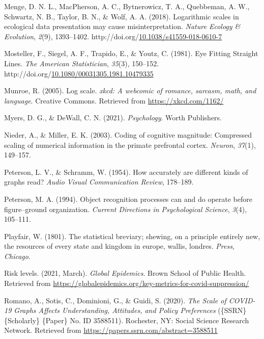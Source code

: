 \documentclass[print]{nuthesis}
\newlength{\cslhangindent}
\newenvironment{CSLReferences}%
{\setlength{\parindent}{0pt}%
\everypar{\setlength{\hangindent}{\cslhangindent}}\ignorespaces}%
{\par}
\begin{document}
\begin{CSLReferences}{1}{0}
\leavevmode\hypertarget{ref-menge_logarithmic_2018}{}%
Menge, D. N. L., MacPherson, A. C., Bytnerowicz, T. A., Quebbeman, A. W., Schwartz, N. B., Taylor, B. N., \& Wolf, A. A. (2018). Logarithmic scales in ecological data presentation may cause misinterpretation. \emph{Nature Ecology \& Evolution}, \emph{2}(9), 1393--1402. http://doi.org/\href{https://doi.org/10.1038/s41559-018-0610-7}{10.1038/s41559-018-0610-7}

\leavevmode\hypertarget{ref-mosteller_eye_1981}{}%
Mosteller, F., Siegel, A. F., Trapido, E., \& Youtz, C. (1981). Eye {Fitting} {Straight} {Lines}. \emph{The American Statistician}, \emph{35}(3), 150--152. http://doi.org/\href{https://doi.org/10.1080/00031305.1981.10479335}{10.1080/00031305.1981.10479335}

\leavevmode\hypertarget{ref-munroe_2005}{}%
Munroe, R. (2005). Log scale. \emph{xkcd: A webcomic of romance, sarcasm, math, and language}. Creative Commons. Retrieved from \url{https://xkcd.com/1162/}

\leavevmode\hypertarget{ref-myers_dewall_2021}{}%
Myers, D. G., \& DeWall, C. N. (2021). \emph{Psychology}. Worth Publishers.

\leavevmode\hypertarget{ref-nieder2003coding}{}%
Nieder, A., \& Miller, E. K. (2003). Coding of cognitive magnitude: Compressed scaling of numerical information in the primate prefrontal cortex. \emph{Neuron}, \emph{37}(1), 149--157.

\leavevmode\hypertarget{ref-peterson1954accurately}{}%
Peterson, L. V., \& Schramm, W. (1954). How accurately are different kinds of graphs read? \emph{Audio Visual Communication Review}, 178--189.

\leavevmode\hypertarget{ref-peterson1994object}{}%
Peterson, M. A. (1994). Object recognition processes can and do operate before figure--ground organization. \emph{Current Directions in Psychological Science}, \emph{3}(4), 105--111.

\leavevmode\hypertarget{ref-playfair1801statistical}{}%
Playfair, W. (1801). The statistical breviary; shewing, on a principle entirely new, the resources of every state and kingdom in europe, wallis, londres. \emph{Press, Chicago}.

\leavevmode\hypertarget{ref-global_epidemics_2021}{}%
Risk levels. (2021, March). \emph{Global Epidemics}. Brown School of Public Health. Retrieved from \url{https://globalepidemics.org/key-metrics-for-covid-suppression/}

\leavevmode\hypertarget{ref-romano_scale_2020}{}%
Romano, A., Sotis, C., Dominioni, G., \& Guidi, S. (2020). \emph{The {Scale} of {COVID}-19 {Graphs} {Affects} {Understanding}, {Attitudes}, and {Policy} {Preferences}} (\{SSRN\} \{Scholarly\} \{Paper\} No. ID 3588511). Rochester, NY: Social Science Research Network. Retrieved from \url{https://papers.ssrn.com/abstract=3588511}


\end{CSLReferences}
\end{document}
